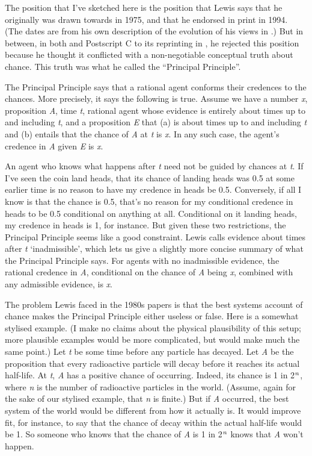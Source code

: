 The position that I've sketched here is the position that Lewis says that he originally was drawn towards in 1975, and that he endorsed in print in 1994. (The dates are from his own description of the evolution of his views in \citeyearpar{Lewis1994a}.) But in between, in both \citeyearpar{Lewis1980a} and Postscript C to its reprinting in \citeyearpar{Lewis1986b}, he rejected this position because he thought it conflicted with a non-negotiable conceptual truth about chance. This truth was what he called the ``Principal Principle''.

The Principal Principle says that a rational agent conforms their credences to the chan\-ces. More precisely, it says the following is true. Assume we have a number \textit{x}, proposition \textit{A}, time \textit{t}, rational agent whose evidence is entirely about times up to and including \textit{t}, and a proposition \textit{E} that (a) is about times up to and including \textit{t} and (b) entails that the chance of \textit{A} at \textit{t} is \textit{x}. In any such case, the agent's credence in \textit{A} given \textit{E} is \textit{x}.

An agent who knows what happens after \textit{t} need not be guided by chances at \textit{t}. If I've seen the coin land heads, that its chance of landing heads was 0.5 at some earlier time is no reason to have my credence in heads be 0.5. Conversely, if all I know is that the chance is 0.5, that's no reason for my conditional credence in heads to be 0.5 conditional on anything at all. Conditional on it landing heads, my credence in heads is 1, for instance. But given these two restrictions, the Principal Principle seems like a good constraint. Lewis calls evidence about times after \textit{t} `inadmissible', which lets us give a slightly more concise summary of what the Principal Principle says. For agents with no inadmissible evidence, the rational credence in \textit{A}, conditional on the chance of \textit{A} being \textit{x}, combined with any admissible evidence, is \textit{x}.

The problem Lewis faced in the 1980s papers is that the best systems account of chance makes the Principal Principle either useless or false. Here is a somewhat stylised example. (I make no claims about the physical plausibility of this setup; more plausible examples would be more complicated, but would make much the same point.) Let \textit{t} be some time before any particle has decayed. Let \textit{A} be the proposition that every radioactive particle will decay before it reaches its actual half-life. At \textit{t}, \textit{A} has a positive chance of occurring. Indeed, its chance is 1 in 2\(^\text{\textit{n}}\), where \textit{n} is the number of radioactive particles in the world. (Assume, again for the sake of our stylised example, that \textit{n} is finite.) But if \textit{A} occurred, the best system of the world would be different from how it actually is. It would improve fit, for instance, to say that the chance of decay within the actual half-life would be 1. So someone who knows that the chance of \textit{A} is 1 in 2\(^\text{\textit{n}}\) knows that \textit{A} won't happen.

